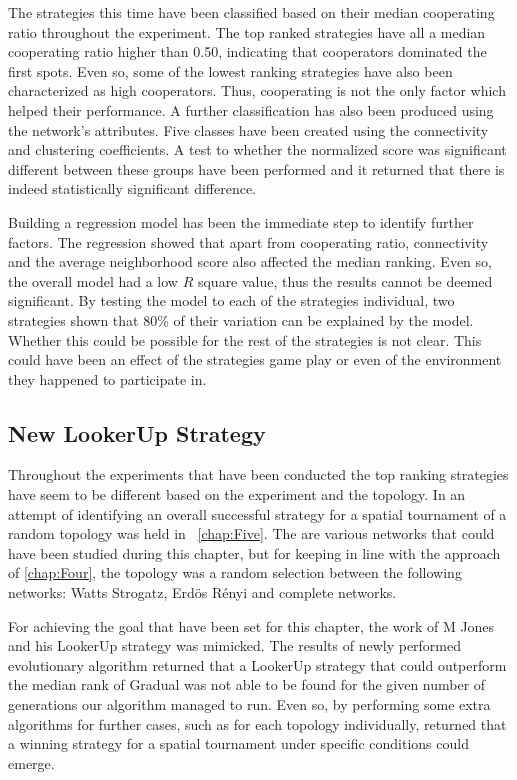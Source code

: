 The strategies this time have been classified based on their median cooperating
ratio throughout the experiment. The top ranked strategies have all a median cooperating
ratio higher than 0.50, indicating that cooperators
dominated the first spots. Even so, some of the lowest ranking strategies have
also been characterized as high cooperators. Thus, cooperating is not the only
factor which helped their performance. A further classification has also been
produced using the network's attributes. Five classes have been created using
the connectivity and clustering coefficients. A test to whether the normalized
score was significant different between these groups have been performed and it
returned that there is indeed statistically significant difference.

Building a regression model has been the immediate step to identify further factors.
The regression showed that apart from cooperating ratio, connectivity and the
average neighborhood score also affected the median ranking. Even so, the overall model
had a low \(R\) square value, thus the results cannot be deemed significant. By testing
the model to each of the strategies individual, two strategies shown that 80\% of
their variation can be explained by the model. Whether this could be possible
for the rest of the strategies is not clear. This could have been an effect of
the strategies game play or even of the environment they happened to participate in.

\subsection{New LookerUp Strategy}

Throughout the experiments that have been conducted the top ranking strategies
have seem to be different based on the experiment and the topology. In an attempt
of identifying an overall successful strategy for a spatial tournament of
a random topology was held in ~\autoref{chap:Five}. The are various networks
that could have been studied during this chapter, but for keeping in line with
the approach of \autoref{chap:Four}, the topology was a random selection between
the following networks: Watts Strogatz, Erd\"{o}s R\'{e}nyi and complete networks.

For achieving the goal that have been set for this chapter, the work of
M Jones and his LookerUp strategy was mimicked. The results of newly performed
evolutionary algorithm returned that a LookerUp strategy that could outperform
the median rank of Gradual was not able to be found for the given number of generations
our algorithm managed to run. Even so, by performing some extra algorithms for further
cases, such as for each topology individually, returned that a winning strategy for
a spatial tournament under specific conditions could emerge.

